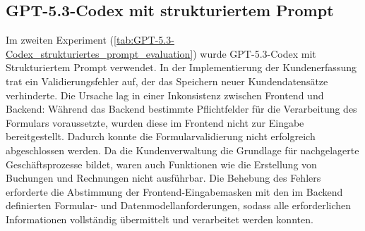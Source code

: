 \subsection{GPT-5.3-Codex mit strukturiertem Prompt}

Im zweiten Experiment (\ref{tab:GPT-5.3-Codex_strukturiertes_prompt_evaluation}) wurde GPT-5.3-Codex mit Strukturiertem Prompt verwendet. In der Implementierung der Kundenerfassung trat ein Validierungsfehler auf, der das Speichern neuer Kundendatensätze verhinderte. Die Ursache lag in einer Inkonsistenz zwischen Frontend und Backend: Während das Backend bestimmte Pflichtfelder für die Verarbeitung des Formulars voraussetzte, wurden diese im Frontend nicht zur Eingabe bereitgestellt. Dadurch konnte die Formularvalidierung nicht erfolgreich abgeschlossen werden.
Da die Kundenverwaltung die Grundlage für nachgelagerte Geschäftsprozesse bildet, waren auch Funktionen wie die Erstellung von Buchungen und Rechnungen nicht ausführbar. Die Behebung des Fehlers erforderte die Abstimmung der Frontend-Eingabemasken mit den im Backend definierten Formular- und Datenmodellanforderungen, sodass alle erforderlichen Informationen vollständig übermittelt und verarbeitet werden konnten.

